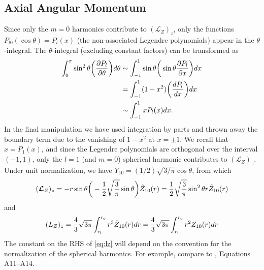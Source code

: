 \documentclass[12pt]{article} %
\newcommand{\pderiv}[2]{\frac{\partial#1}{\partial#2}}
\newcommand{\tz}{\tilde{Z}}
\newcommand{\ri}{r_{\rm{i}}}
\newcommand{\ro}{r_{\rm{o}}}
\begin{document}
\subsection{Axial Angular Momentum}
Since only the $m=0$ harmonics contribute to $(\bm{\mathcal{L}}_Z)_z$, only the functions $P_{l0}(\cos\theta) = P_l(x)$ (the non-associated Legendre polynomials) appear in the $\theta$-integral. The $\theta$-integral (excluding constant factors) can be transformed as
\begin{align*}
\int_0^\pi \sin^2\theta \bigg{(}\pderiv{P_l}{\theta}\bigg{)}d\theta &\sim \int_{-1}^1\sin\theta\bigg{(}\sin\theta\pderiv{P_l}{x}\bigg{)}dx\\
	&= \int_{-1}^1(1-x^2)\bigg{(}\frac{dP_l}{dx}\bigg{)}dx\\
	&\sim\int_{-1}^1xP_l(x)dx.
\end{align*}
In the final manipulation we have used integration by parts and thrown away the boundary term due to the vanishing of $1-x^2$ at $x=\pm1$. We recall that $x=P_1(x)$, and since the Legendre polynomials are orthogonal over the interval $(-1,1)$, only the $l=1$ (and $m=0$) spherical harmonic contributes to  $(\bm{\mathcal{L}}_Z)_z$. Under unit normalization, we have $Y_{10} = (1/2)\sqrt{3/\pi}\cos\theta$, from which 
\begin{align*}
(\bm{\mathcal{L}}_Z)_z = -r\sin\theta\bigg{(}-\frac{1}{2}\sqrt{\frac{3}{\pi}}\sin\theta\bigg{)}\tz_{10}(r) = \frac{1}{2}\sqrt{\frac{3}{\pi}}\sin^2\theta r \tz_{10}(r)
\end{align*}
and
\begin{align}
(L_Z)_z = \frac{4}{3}\sqrt{3\pi}\int_{\ri}^{\ro}r^3\tz_{10}(r)dr =  \frac{4}{3}\sqrt{3\pi}\int_{\ri}^{\ro}r^2Z_{10}(r)dr
\label{eq:lz}
\end{align}
The constant on the RHS of \eqref{eq:lz} will depend on the convention for the normalization of the spherical harmonics. For example, compare to \citet{Jones11}, Equations A11--A14. 
\end{document}
